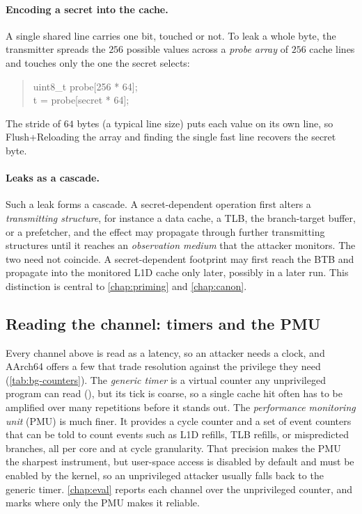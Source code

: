 \paragraph{Encoding a secret into the cache.}
A single shared line carries one bit, touched or not. To leak a whole byte, the transmitter spreads
the $256$ possible values across a \emph{probe array} of $256$ cache lines and touches only the one
the secret selects:
\begin{quote}\ttfamily
uint8\_t probe[256 * 64];\\
t = probe[secret * 64];
\end{quote}
The stride of $64$ bytes (a typical line size) puts each value on its own line, so Flush+Reloading
the array and finding the single fast line recovers the secret byte.

\paragraph{Leaks as a cascade.}
Such a leak forms a cascade. A secret-dependent operation first alters a \emph{transmitting
structure}, for instance a data cache, a TLB, the branch-target buffer, or a prefetcher, and the
effect may propagate through further transmitting structures until it reaches an
\emph{observation medium} that the attacker monitors. The two need not coincide. A
secret-dependent footprint may first reach the BTB and propagate into the monitored L1D cache
only later, possibly in a later run. This distinction is central to \autoref{chap:priming} and
\autoref{chap:canon}.

\subsection{Reading the channel: timers and the PMU}
\label{sec:bg-pmu}

Every channel above is read as a latency, so an attacker needs a clock, and AArch64 offers a few
that trade resolution against the privilege they need (\autoref{tab:bg-counters}). The \emph{generic
timer} is a virtual counter any unprivileged program can read (), but its tick is
coarse, so a single cache hit often has to be amplified over many repetitions before it stands out.
The \emph{performance monitoring unit} (PMU) is much finer. It provides a cycle counter and a set of
event counters that can be told to count events such as L1D refills, TLB refills, or mispredicted
branches, all per core and at cycle granularity. That precision makes the PMU the sharpest
instrument, but user-space access is disabled by default and must be enabled by the kernel, so an
unprivileged attacker usually falls back to the generic timer. \autoref{chap:eval} reports each
channel over the unprivileged  counter, and marks where only the PMU makes it
reliable.

